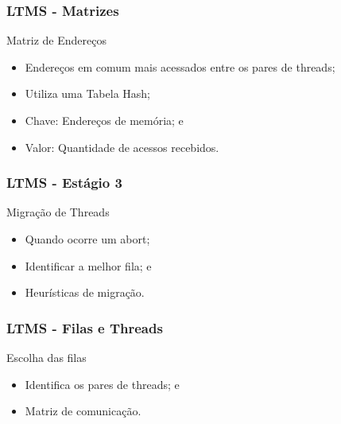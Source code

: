\documentclass[10pt, pdf,xcolor=pdftex,dvipsnames,table]{beamer}
\begin{document}
\begin{frame} \frametitle{LTMS - Matrizes}
    \begin{block}{Matriz de Endereços}
        \begin{itemize}
        	\item Endereços em comum mais acessados entre os pares de threads;
        	\item Utiliza uma Tabela Hash;
        	\item Chave: Endereços de memória; e 
            \item Valor: Quantidade de acessos recebidos.
        \end{itemize}
    \end{block}
\end{frame}

\begin{frame} \frametitle{LTMS - Estágio 3}
    \begin{block}{Migração de Threads}
        \begin{itemize}
        	\item Quando ocorre um abort;
        	\item Identificar a melhor fila; e
            \item Heurísticas de migração.
        \end{itemize}
    \end{block}
\end{frame}

\begin{frame} \frametitle{LTMS - Filas e Threads}
    \begin{block}{Escolha das filas}
        \begin{itemize}
        	\item Identifica os pares de threads; e
        	\item Matriz de comunicação.
        \end{itemize}
    \end{block}
\end{frame}
\end{document}
